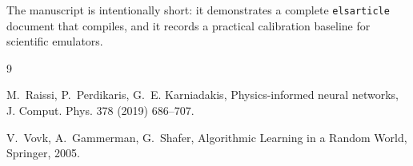 \documentclass[preprint,12pt]{elsarticle}
\begin{document}
The manuscript is intentionally short: it demonstrates a complete \texttt{elsarticle} document that compiles, and it records a practical calibration baseline for scientific emulators.

\begin{thebibliography}{9}

M.~Raissi, P.~Perdikaris, G.~E. Karniadakis, Physics-informed neural networks, J. Comput. Phys. 378 (2019) 686--707.

V.~Vovk, A.~Gammerman, G.~Shafer, Algorithmic Learning in a Random World, Springer, 2005.

\end{thebibliography}
\end{document}
